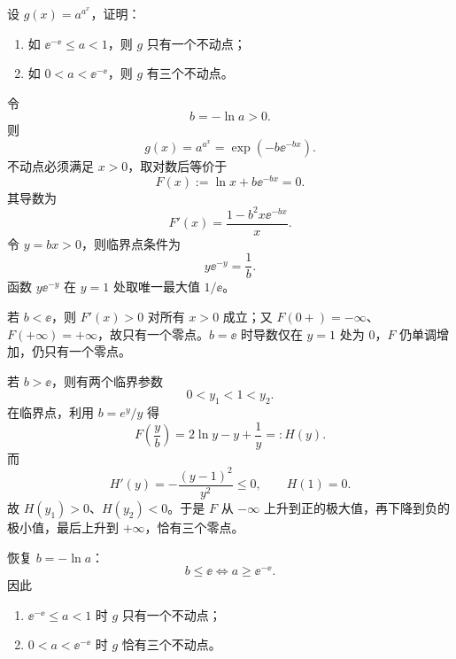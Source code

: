 \begin{xreferenceproblem}[18]
设 $g(x)=a^{a^x}$，证明：
  \begin{enumerate}[label=(\arabic*)]
    \item 如 $\ee^{-\ee}\le a<1$，则 $g$ 只有一个不动点；
    \item 如 $0<a<\ee^{-\ee}$，则 $g$ 有三个不动点。
  \end{enumerate}
\end{xreferenceproblem}
\begin{xsolution}
令
\[
  b=-\ln a>0.
\]
则
\[
  g(x)=a^{a^x}=\exp(-b\ee^{-bx}).
\]
不动点必须满足 $x>0$，取对数后等价于
\[
  F(x):=\ln x+b\ee^{-bx}=0.
\]
其导数为
\[
  F'(x)=\frac{1-b^2x\ee^{-bx}}x.
\]
令 $y=bx>0$，则临界点条件为
\[
  y\ee^{-y}=\frac1b.
\]
函数 $y\ee^{-y}$ 在 $y=1$ 处取唯一最大值 $1/\ee$。

若 $b<\ee$，则 $F'(x)>0$ 对所有 $x>0$ 成立；又 $F(0+)=-\infty$、$F(+\infty)=+\infty$，故只有一个零点。$b=\ee$ 时导数仅在 $y=1$ 处为 0，$F$ 仍单调增加，仍只有一个零点。

若 $b>\ee$，则有两个临界参数
\[
  0<y_1<1<y_2.
\]
在临界点，利用 $b=e^y/y$ 得
\[
  F\left(\frac yb\right)
  =2\ln y-y+\frac1y=:H(y).
\]
而
\[
  H'(y)=-\frac{(y-1)^2}{y^2}\le0,
  \qquad H(1)=0.
\]
故 $H(y_1)>0$、$H(y_2)<0$。于是 $F$ 从 $-\infty$ 上升到正的极大值，再下降到负的极小值，最后上升到 $+\infty$，恰有三个零点。

恢复 $b=-\ln a$：
\[
  b\le\ee\iff a\ge\ee^{-\ee}.
\]
因此
\begin{enumerate}[label=(\arabic*)]
  \item $\ee^{-\ee}\le a<1$ 时 $g$ 只有一个不动点；
  \item $0<a<\ee^{-\ee}$ 时 $g$ 恰有三个不动点。
\end{enumerate}
\end{xsolution}


